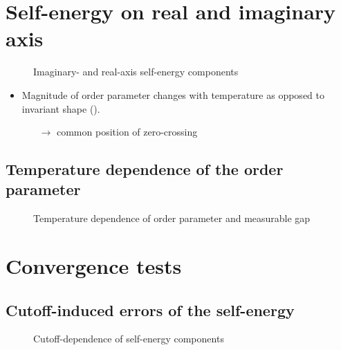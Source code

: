 \section{Self-energy on real and imaginary axis}

\begin{figure}
    \small
	
	
	
	
	
	
	\caption{Imaginary- and real-axis self-energy components}
\end{figure}

\begin{itemize}
    \item Magnitude of order parameter changes with temperature as opposed to
          invariant shape ().
    \begin{itemize}
        \item[$\rightarrow$] common position of zero-crossing
    \end{itemize}
\end{itemize}

\subsection{Temperature dependence of the order parameter}

\begin{figure}
    \small
    \centering
    
    \caption{Temperature dependence of order parameter and measurable gap}
\end{figure}

\section{Convergence tests}

\subsection{Cutoff-induced errors of the self-energy}

\begin{figure}
    \small
    \begin{minipage}{4.666cm}
	    
    \end{minipage}%
    \begin{minipage}{4.666cm}
	    
    \end{minipage}%
    \begin{minipage}{4.666cm}
	    
    \end{minipage}%
	\caption{Cutoff-dependence of self-energy components}
\end{figure}

